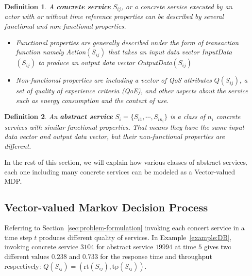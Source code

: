 \documentclass[10pt,journal,compsoc]{IEEEtran}
\newtheorem{definition}{Definition}
\begin{document}
\begin{definition}
A \textbf{concrete service} $S_{ij}$, or a concrete service executed by an actor with or without time reference properties can be described by several \textit{functional} and \textit{non-functional} properties.

\begin{itemize}
\item Functional properties are generally described under the form of transaction function namely Action$(S_{ij})$ that takes an input data vector InputData$(S_{ij})$ to produce an output data vector OutputData$(S_{ij})$
\item Non-functional properties are including a vector of QoS attributes $Q(S_{ij})$, a set of quality of experience criteria (QoE), and other aspects about the service such as energy consumption and the context of use.  
\end{itemize}
\end{definition}

\begin{definition}
An \textbf{abstract service} $S_i = \{ S_{i1}, \cdots, S_{in_i} \}$ is a class of $n_i$ concrete services with similar functional properties. That means they have the same input data vector and output data vector, but their non-functional properties are different.\\
\end{definition}

In the rest of this section, we will explain how various classes of abstract services, each one including many concrete services can be modeled as a Vector-valued MDP. 

\subsection{Vector-valued Markov Decision Process}
Referring to Section~\ref{sec:problem-formulation} invoking each concert service in a time step $t$ produces different quality of services. In Example~\ref{example:DB}, invoking concrete service $3104$ for abstract service $19994$ at time $5$ gives two different values $0.238$ and $0.733$ for the response time and throughput respectively: $Q(S_{ij}) = (\text{rt}(S_{ij}), \text{tp}(S_{ij}))$. \\
\end{document}
